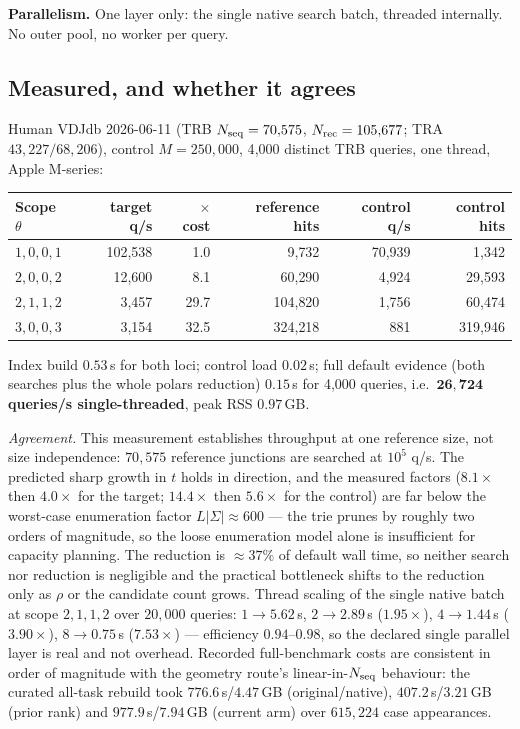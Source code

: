 \documentclass[10pt,a4paper]{article}
\theoremstyle{definition}
\begin{document}
\textbf{Parallelism.} One layer only: the single native search batch, threaded internally. No outer
pool, no worker per query.

\subsection*{Measured, and whether it agrees}
Human VDJdb 2026-06-11 (TRB $N_{\rm seq}=70{,}575$, $N_{\rm rec}=105{,}677$; TRA $43{,}227/68{,}206$),
control $M=250{,}000$, 4{,}000 distinct TRB queries, one thread, Apple M-series:

\begin{center}\small
\begin{tabular}{@{}lrrrrr@{}}
\toprule
Scope $\theta$ & target q/s & $\times$ cost & reference hits & control q/s & control hits\\
\midrule
$1,0,0,1$ & 102{,}538 & 1.0 & 9{,}732 & 70{,}939 & 1{,}342\\
$2,0,0,2$ & 12{,}600 & 8.1 & 60{,}290 & 4{,}924 & 29{,}593\\
$2,1,1,2$ & 3{,}457 & 29.7 & 104{,}820 & 1{,}756 & 60{,}474\\
$3,0,0,3$ & 3{,}154 & 32.5 & 324{,}218 & 881 & 319{,}946\\
\bottomrule
\end{tabular}
\end{center}
\label{tab:perf}

Index build $0.53$\,s for both loci; control load $0.02$\,s; full default evidence (both searches
plus the whole polars reduction) $0.15$\,s for 4{,}000 queries, i.e.\ $\mathbf{26{,}724}$
\textbf{queries/s single-threaded}, peak RSS $0.97$\,GB.

\emph{Agreement.} This measurement establishes throughput at one reference size, not size independence: $70{,}575$ reference
junctions are searched at $10^5$ q/s. The predicted sharp growth in $t$ holds in direction, and the
measured factors ($8.1\times$ then $4.0\times$ for the target; $14.4\times$ then $5.6\times$ for the
control) are far below the worst-case enumeration factor $L|\Sigma|\approx600$ --- the trie prunes
by roughly two orders of magnitude, so the loose enumeration model alone is insufficient for capacity planning. The reduction is $\approx37\%$ of default wall time, so neither search nor
reduction is negligible and the practical bottleneck shifts to the reduction only as $\rho$ or the
candidate count grows. Thread scaling of the single native batch at scope $2,1,1,2$ over
$20{,}000$ queries: $1\to5.62$\,s, $2\to2.89$\,s ($1.95\times$), $4\to1.44$\,s ($3.90\times$),
$8\to0.75$\,s ($7.53\times$) --- efficiency $0.94$--$0.98$, so the declared single parallel layer is
real and not overhead. Recorded full-benchmark costs are consistent in order of magnitude with the
geometry route's linear-in-$N_{\rm seq}$ behaviour: the curated all-task rebuild took
$776.6$\,s/$4.47$\,GB (original/native), $407.2$\,s/$3.21$\,GB (prior rank) and $977.9$\,s/$7.94$\,GB
(current arm) over $615{,}224$ case appearances.
\end{document}
